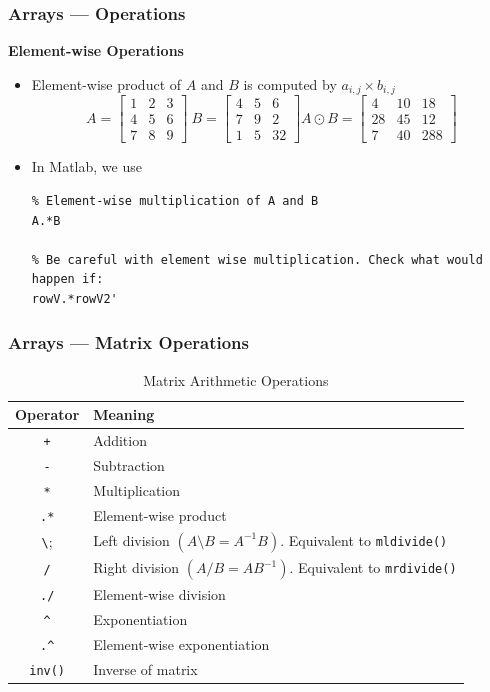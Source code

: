 \documentclass[11pt,xcolor={svgnames},aspectratio=169,usepdftitle=false,notheorems]{beamer}
\begin{document}
\begin{frame}[fragile]
    \frametitle{Arrays --- Operations}
    \alert{\textbf{Element-wise Operations}}
\begin{itemize}
    \item Element-wise product of $A$ and $B$ is computed by $a_{i,j}\times b_{i,j}$
    \[
    A = \begin{bmatrix}
        1 & 2 & 3 \\
        4 & 5 & 6 \\
        7 & 8 & 9 
        \end{bmatrix} \ 
    B = \begin{bmatrix}
        4 & 5 & 6 \\
        7 & 9 & 2 \\
        1 & 5 & 32
        \end{bmatrix}
    A \odot B = 
    \begin{bmatrix}
        4  &  10 &   18 \\
        28  &  45 &   12 \\
        7  &  40 &  288
    \end{bmatrix}    
    \]
    \item In Matlab, we use
\begin{lstlisting}
% Element-wise multiplication of A and B
A.*B
    
% Be careful with element wise multiplication. Check what would happen if:
rowV.*rowV2'
\end{lstlisting}
\end{itemize}
\end{frame}

\begin{frame}[fragile]
    \frametitle{Arrays --- Matrix Operations}
    \begin{table}[htbp]
        \caption{Matrix Arithmetic Operations}
        \label{tab:matrix_operators}
        \begin{tabular}{@{}cl@{}}
        \toprule
        Operator & Meaning \\ \midrule
        \verb;+;  & Addition \\ 
        \verb;-;  & Subtraction \\ 
        \verb;*;  & Multiplication \\ 
        \verb;.*; & Element-wise product \\
        \verb;\;  & Left division $(A \setminus B = A^{-1}B)$. Equivalent to \verb;mldivide(); \\
        \verb;/;  & Right division $(A / B = AB^{-1})$. Equivalent to \verb;mrdivide(); \\
        \verb;./; & Element-wise division \\ 
        \verb;^;  & Exponentiation \\
        \verb;.^;  & Element-wise exponentiation \\
        \verb;inv(); & Inverse of matrix \\ \bottomrule
        \end{tabular}
    \end{table}
\end{frame}
\end{document}
